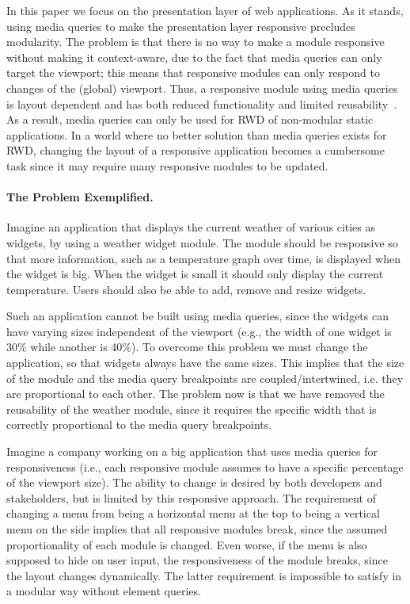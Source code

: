 \documentclass[]{llncs}
\begin{document}
  In this paper we focus on the presentation layer of web applications.
  As it stands, using media queries to make the presentation layer responsive precludes modularity.
  The problem is that there is no way to make a module responsive without making it context-aware, due to the fact that media queries can only target the viewport; this means that responsive modules can only respond to changes of the (global) viewport.
  Thus, a responsive module using media queries is layout dependent and has both reduced functionality and limited reusability~\cite{elq-thesis}.
  As a result, media queries can only be used for RWD of non-modular static applications.
  In a world where no better solution than media queries exists for RWD, changing the layout of a responsive application becomes a cumbersome task since it may require many responsive modules to be updated.

  \paragraph{The Problem Exemplified.}
    Imagine an application that displays the current weather of various cities as widgets, by using a weather widget module.
    The module should be responsive so that more information, such as a temperature graph over time, is displayed when the widget is big.
    When the widget is small it should only display the current temperature.
    Users should also be able to add, remove and resize widgets.

    Such an application cannot be built using media queries, since the widgets can have varying sizes independent of the viewport (e.g., the width of one widget is 30\% while another is 40\%).
    To overcome this problem we must change the application, so that widgets always have the same sizes.
    This implies that the size of the module and the media query breakpoints are coupled/intertwined, i.e. they are proportional to each other.
    The problem now is that we have removed the reusability of the weather module, since it requires the specific width that is correctly proportional to the media query breakpoints.

    Imagine a company working on a big application that uses media queries for responsiveness (i.e., each responsive module assumes to have a specific percentage of the viewport size).
    The ability to change is desired by both developers and stakeholders, but is limited by this responsive approach.
    The requirement of changing a menu from being a horizontal menu at the top to being a vertical menu on the side implies that all responsive modules break, since the assumed proportionality of each module is changed.
    Even worse, if the menu is also supposed to hide on user input, the responsiveness of the module breaks, since the layout changes dynamically.
    The latter requirement is impossible to satisfy in a modular way without element queries.
\end{document}
